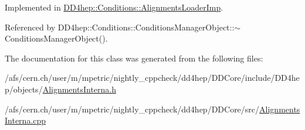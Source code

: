 Implemented in \hyperlink{class_d_d4hep_1_1_conditions_1_1_alignments_loader_imp_aa9cf749689a76b853f7d7e543f84b761}{D\+D4hep\+::\+Conditions\+::\+Alignments\+Loader\+Imp}.



Referenced by D\+D4hep\+::\+Conditions\+::\+Conditions\+Manager\+Object\+::$\sim$\+Conditions\+Manager\+Object().



The documentation for this class was generated from the following files\+:\begin{DoxyCompactItemize}
\item 
/afs/cern.\+ch/user/m/mpetric/nightly\+\_\+cppcheck/dd4hep/\+D\+D\+Core/include/\+D\+D4hep/objects/\hyperlink{_alignments_interna_8h}{Alignments\+Interna.\+h}\item 
/afs/cern.\+ch/user/m/mpetric/nightly\+\_\+cppcheck/dd4hep/\+D\+D\+Core/src/\hyperlink{_alignments_interna_8cpp}{Alignments\+Interna.\+cpp}\end{DoxyCompactItemize}
